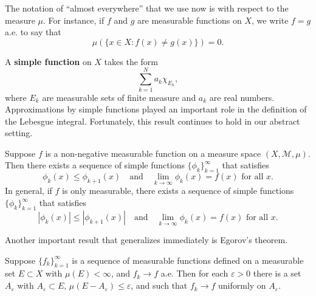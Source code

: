 The notation of ``almost everywhere'' that we use now is with respect to the measure $\mu$.
For instance, if $f$ and $g$ are measurable functions on $X$,
we write $f=g$ a.e. to say that 
\[
\mu(\{x\in X: f(x)\neq g(x)\}) = 0.
\]

A \textbf{simple function} on $X$ takes the form 
\[
\sum_{k=1}^N a_k\chi_{E_k},
\]
where $E_k$ are measurable sets of finite measure and $a_k$ are real numbers.
Approximations by simple functions played an important role in the definition of the Lebesgue integral.
Fortunately, this result continues to hold in our abstract setting.

\begin{theorem}
  Suppose $f$ is a non-negative measurable function on a measure space $(X,\mathcal M,\mu)$.
  Then there exists a sequence of simple functions $\{\phi_k\}^\infty_{k=1}$ that satisfies 
  \[
  \phi_k(x)\leq \phi_{k+1}(x) 
  \quad\text{and}\quad
  \lim_{k\to\infty}\phi_k(x) = f(x) \text{ for all }x.
  \]
  In general, if $f$ is only measurable, there exists a sequence of simple functions $\{\phi_k\}_{k=1}^\infty$ that satisfies 
  \[
  |\phi_k(x)| \leq |\phi_{k+1}(x)|
  \quad\text{and}\quad
  \lim_{k\to\infty}\phi_k(x) = f(x)\text{ for all }x.
  \]
\end{theorem}

Another important result that generalizes immediately is Egorov's theorem.

\begin{theorem}
  Suppose $\{f_k\}_{k=1}^\infty$ is a sequence of measurable functions defined on a measurable set $E\subset X$ with $\mu(E)<\infty$, and $f_k\to f$ a.e. 
  Then for each $\varepsilon > 0$ there is a set $A_\varepsilon$ with $A_\varepsilon\subset E$,
  $\mu(E-A_\varepsilon) \leq \varepsilon$, and such that $f_k\to f$ uniformly on $A_\varepsilon$.
\end{theorem}

